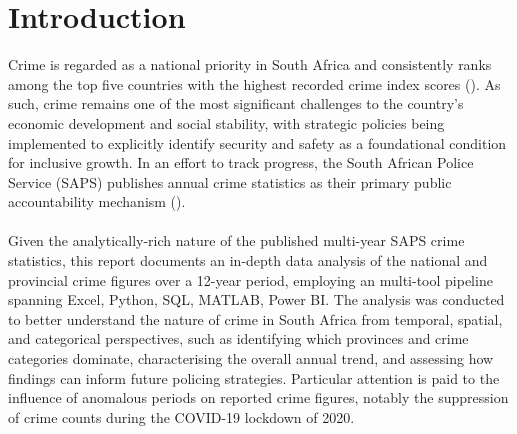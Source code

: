 \documentclass[titlepage, 12pt, oneside]{article}
\numberwithin{equation}{section}
\begin{document}
	\section{Introduction}
	Crime is regarded as a national priority in South Africa and consistently ranks among the top five countries with the highest recorded crime index scores (\cite{numbeo}). As such, crime remains one of the most significant challenges to the country's economic development and social stability, with strategic policies being implemented to explicitly identify security and safety as a foundational condition for inclusive growth. In an effort to track progress, the South African Police Service (SAPS) publishes annual crime statistics as their primary public accountability mechanism (\cite{saps2023}). \\\\
	Given the analytically-rich nature of the published multi-year SAPS crime statistics, this report documents an in-depth data analysis of the national and provincial crime figures over a 12-year period, employing an multi-tool pipeline spanning Excel, Python, SQL, MATLAB, Power BI. The analysis was conducted to better understand the nature of crime in South Africa from temporal, spatial, and categorical perspectives, such as identifying which provinces and crime categories dominate, characterising the overall annual trend, and assessing how findings can inform future policing strategies. Particular attention is paid to the influence of anomalous periods on reported crime figures, notably the suppression of crime counts during the COVID-19 lockdown of 2020.
\end{document}
